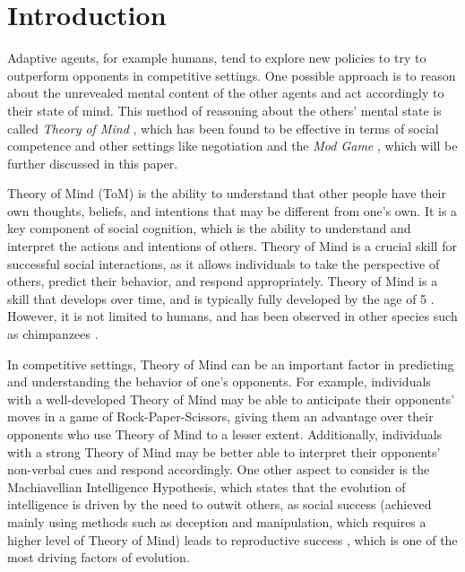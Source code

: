 \section{Introduction}\label{sec:introduction}

Adaptive agents, for example humans, tend to explore new policies to try to outperform opponents in competitive settings. One possible approach is to reason about the unrevealed mental content of the other agents and act accordingly to their state of mind. This method of reasoning about the others' mental state is called \textit{Theory of Mind} \citep{premack1978does}, which has been found to be effective in terms of social competence \citep{liddle2006higher} and other settings like negotiation \citep{de2017negotiating} and the \textit{Mod Game} \citep{veltman2019training}, which will be further discussed in this paper.

Theory of Mind (ToM) is the ability to understand that other people have their own thoughts, beliefs, and intentions that may be different from one's own. It is a key component of social cognition, which is the ability to understand and interpret the actions and intentions of others. Theory of Mind is a crucial skill for successful social interactions, as it allows individuals to take the perspective of others, predict their behavior, and respond appropriately. Theory of Mind is a skill that develops over time, and is typically fully developed by the age of 5 \citep{call2008does}. However, it is not limited to humans, and has been observed in other species such as chimpanzees \citep{premack1978does}.

In competitive settings, Theory of Mind can be an important factor in predicting and understanding the behavior of one's opponents. For example, individuals with a well-developed Theory of Mind may be able to anticipate their opponents' moves in a game of Rock-Paper-Scissors, giving them an advantage over their opponents who use Theory of Mind to a lesser extent\citep{de2013much}. Additionally, individuals with a strong Theory of Mind may be better able to interpret their opponents' non-verbal cues and respond accordingly. One other aspect to consider is the Machiavellian Intelligence Hypothesis, which states that the evolution of intelligence is driven by the need to outwit others, as social success (achieved mainly using methods such as deception and manipulation, which requires a higher level of Theory of Mind) leads to reproductive success \citep{gavrilets2006dynamics}, which is one of the most driving factors of evolution.

